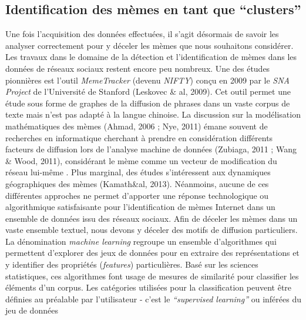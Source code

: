 \subsection[Identification des m\`emes en tant que {\textquotedblleft}clusters{\textquotedblright}]{Identification des m\`emes en tant que {\textquotedblleft}clusters{\textquotedblright}}
Une fois l{\textquoteright}acquisition des donn\'ees effectu\'ees, il
s{\textquoteright}agit d\'esormais de savoir les analyser correctement
pour y d\'eceler les m\`emes que nous souhaitons consid\'erer. Les
travaux dans le domaine de la d\'etection et
l{\textquoteright}identification de m\`emes dans les donn\'ees de
r\'eseaux sociaux restent encore peu nombreux. Une des \'etudes
pionni\`eres est l{\textquoteright}outil \textit{MemeTracker }(devenu
\textit{NIFTY}) con\c{c}u en 2009 par le \textit{SNA Project }de
l{\textquoteright}Universit\'e de Stanford (Leskovec \& al, 2009). Cet
outil permet une \'etude sous forme de graphes de la diffusion de
phrases dans un vaste corpus de texte mais n{\textquoteright}est pas
adapt\'e \`a la langue chinoise. La discussion sur la mod\'elisation
math\'ematiques des m\`emes (Ahmad, 2006 ; Nye, 2011) \'emane souvent
de recherches en informatique cherchant \`a prendre en consid\'eration
diff\'erents facteurs de diffusion lors de l{\textquoteright}analyse
machine de donn\'ees (Zubiaga, 2011 ; Wang \& Wood, 2011),
consid\'erant le m\`eme comme un vecteur de modification du r\'eseau
lui-m\^eme \cite{Ienco2010}. Plus marginal, des \'etudes
s{\textquoteright}int\'eressent aux dynamiques g\'eographiques des
m\`emes (Kamath\&al, 2013). N\'eanmoins, aucune de ces diff\'erentes
approches ne permet d{\textquoteright}apporter une r\'eponse
technologique ou algorithmique satisfaisante pour
l{\textquoteright}identification de m\`emes Internet dans un ensemble
de donn\'ees issu des r\'eseaux sociaux. Afin de d\'eceler les m\`emes
dans un vaste ensemble textuel, nous devons y d\'eceler des motifs de
diffusion particuliers. La d\'enomination \textit{machine learning
}regroupe un ensemble d{\textquoteright}algorithmes qui permettent
d{\textquoteright}explorer des jeux de donn\'ees pour en extraire des
repr\'esentations et y identifier des propri\'et\'es
(\textit{features}) particuli\`eres. Bas\'e sur les sciences
statistiques, ces algorithmes font usage de mesures de similarit\'e
pour classifier les \'el\'ements d{\textquoteright}un corpus. Les
cat\'egories utilis\'ees pour la classification peuvent \^etre
d\'efinies au pr\'ealable par l{\textquoteright}utilisateur -
c{\textquoteright}est le \textit{{\textquotedblleft}supervised
learning{\textquotedblright} }ou inf\'er\'ees du jeu de donn\'ees
